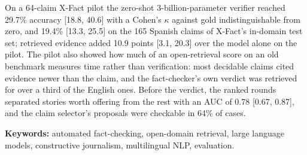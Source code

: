 On a 64-claim X-Fact pilot the zero-shot 3-billion-parameter verifier
reached 29.7\% accuracy [18.8, 40.6] with a Cohen's $\kappa$ against
gold indistinguishable from zero, and 19.4\% [13.3, 25.5] on the 165
Spanish claims of X-Fact's in-domain test set; retrieved evidence added
10.9 points [3.1, 20.3] over the model alone on the pilot. The pilot
also showed how much of an open-retrieval score on an old benchmark
measures time rather than verification: most decidable claims cited
evidence newer than the claim, and the fact-checker's own verdict was
retrieved for over a third of the English ones. Before the verdict, the
ranked rounds separated stories worth offering from the rest with an
AUC of 0.78 [0.67, 0.87], and the claim selector's proposals were
checkable in 64\% of cases.

\textbf{Keywords:} automated fact-checking, open-domain retrieval,
large language models, constructive journalism, multilingual NLP,
evaluation.
